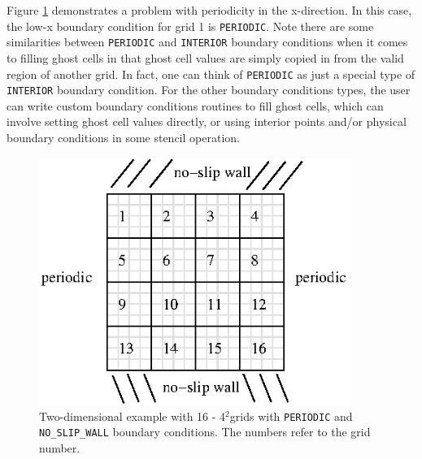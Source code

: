 Figure \ref{fig:bc_example2} demonstrates a problem with periodicity in the x-direction.
In this case, the low-x boundary condition for grid 1 is {\tt PERIODIC}.  Note there are some
similarities between {\tt PERIODIC} and {\tt INTERIOR} boundary conditions when
it comes to filling ghost cells in that ghost cell values are simply copied in from the valid
region of another grid.  In fact, one can think of {\tt PERIODIC} as just
a special type of {\tt INTERIOR} boundary condition.
For the other boundary conditions types, the user can write custom boundary 
conditions routines to fill ghost cells, which can involve setting ghost cell values 
directly, or using interior points and/or physical boundary conditions in some stencil operation.
\begin{figure}[tb]
\centering
\includegraphics[width=4in]{./AdvancedTopics/bc_example2}
\caption{\label{fig:bc_example2}Two-dimensional example with 16 - 4$^2$grids with
{\tt PERIODIC} and {\tt NO\_SLIP\_WALL} boundary conditions.
The numbers refer to the grid number.}
\end{figure}

